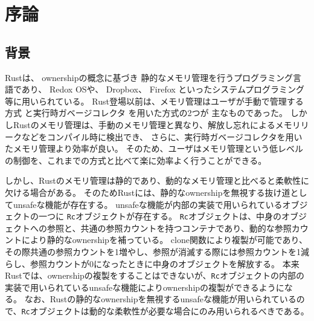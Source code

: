 \documentclass{sumiilab-paper}
\theoremstyle{mystyle}
\numberwithin{definition}{chapter} %
\begin{document}
\tableofcontents%

\mainmatter%

\chapter{序論}
\section{背景}
Rust\cite{DBLP:conf/sigada/MatsakisK14, rust-web, rust-book}は、
ownership\cite{DBLP:conf/oopsla/ClarkePN98}の概念に基づき
静的なメモリ管理を行うプログラミング言語であり、
Redox OS\cite{redox}や、
Dropbox\cite{dropbox}、
Firefox\cite{fire}
といったシステムプログラミング等に用いられている\cite{rust-web}。
Rust登場以前は、メモリ管理はユーザが手動で管理する方式
\cite{c-book}
と実行時ガベージコレクタ\cite{gc-book}
を用いた方式の2つが
主なものであった。
しかしRustのメモリ管理は、手動のメモリ管理と異なり、解放し忘れによるメモリリークなどをコンパイル時に検出でき、
さらに、実行時ガベージコレクタを用いたメモリ管理より効率が良い。
そのため、ユーザはメモリ管理という低レベルの制御を、これまでの方式と比べて楽に効率よく行うことができる。

しかし、Rustのメモリ管理は静的であり、動的なメモリ管理と比べると柔軟性に欠ける場合がある。
そのためRustには、静的なownershipを無視する抜け道としてunsafeな機能が存在する。
unsafeな機能が内部の実装で用いられているオブジェクトの一つに
\texttt{Rc}オブジェクト\cite{rc}が存在する。
\texttt{Rc}オブジェクトは、中身のオブジェクトへの参照と、共通の参照カウントを持つコンテナであり、動的な参照カウントにより静的なownershipを補っている。
clone関数により複製が可能であり、その際共通の参照カウントを1増やし、参照が消滅する際には参照カウントを1減らし、参照カウントが0になったときに中身のオブジェクトを解放する。
本来Rustでは、ownershipの複製をすることはできないが、\texttt{Rc}オブジェクトの内部の実装で用いられているunsafeな機能によりownershipの複製ができるようになる。
なお、Rustの静的なownershipを無視するunsafeな機能が用いられているので、\texttt{Rc}オブジェクトは動的な柔軟性が必要な場合にのみ用いられるべきである。
\end{document}
